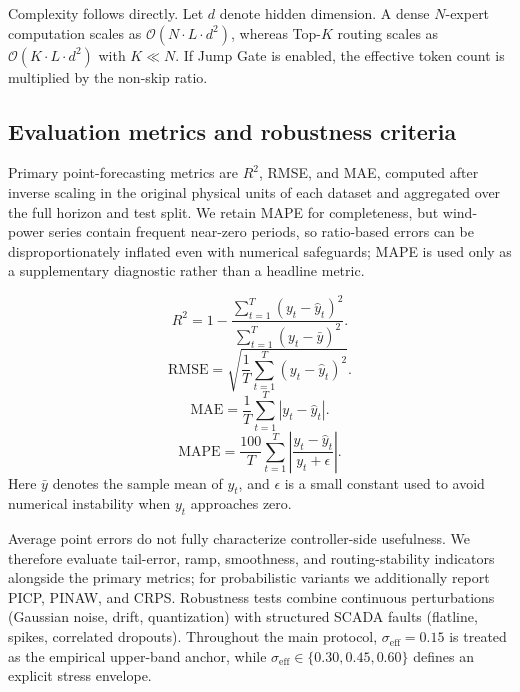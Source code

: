 \documentclass[review,1p,times]{elsarticle}
\begin{document}
Complexity follows directly.\label{sec:complexity}
Let $d$ denote hidden dimension. A dense $N$-expert computation scales as $\mathcal{O}(N\cdot L \cdot d^2)$, whereas Top-$K$ routing scales as $\mathcal{O}(K\cdot L \cdot d^2)$ with $K\ll N$. If Jump Gate is enabled, the effective token count is multiplied by the non-skip ratio.

\subsection{Evaluation metrics and robustness criteria}
\label{subsec:eval_metrics}

Primary point-forecasting metrics are $R^2$, RMSE, and MAE, computed after inverse scaling in the original physical units of each dataset and aggregated over the full horizon and test split. We retain MAPE for completeness, but wind-power series contain frequent near-zero periods, so ratio-based errors can be disproportionately inflated even with numerical safeguards; MAPE is used only as a supplementary diagnostic rather than a headline metric.

\begin{equation}
R^2 = 1 - \frac{\sum_{t=1}^{T}(y_t - \hat{y}_t)^2}{\sum_{t=1}^{T}(y_t - \bar{y})^2}.
\end{equation}
\begin{equation}
\text{RMSE} = \sqrt{\frac{1}{T}\sum_{t=1}^{T}(y_t - \hat{y}_t)^2}.
\end{equation}
\begin{equation}
\text{MAE} = \frac{1}{T}\sum_{t=1}^{T}|y_t - \hat{y}_t|.
\end{equation}
\begin{equation}
\text{MAPE} = \frac{100}{T}\sum_{t=1}^{T}\left|\frac{y_t - \hat{y}_t}{y_t + \epsilon}\right|.
\end{equation}
Here $\bar{y}$ denotes the sample mean of $y_t$, and $\epsilon$ is a small constant used to avoid numerical instability when $y_t$ approaches zero.

Average point errors do not fully characterize controller-side usefulness. We therefore evaluate tail-error, ramp, smoothness, and routing-stability indicators alongside the primary metrics; for probabilistic variants we additionally report PICP, PINAW, and CRPS. Robustness tests combine continuous perturbations (Gaussian noise, drift, quantization) with structured SCADA faults (flatline, spikes, correlated dropouts). Throughout the main protocol, $\sigma_{\mathrm{eff}}=0.15$ is treated as the empirical upper-band anchor, while $\sigma_{\mathrm{eff}}\in\{0.30,0.45,0.60\}$ defines an explicit stress envelope.
\end{document}
